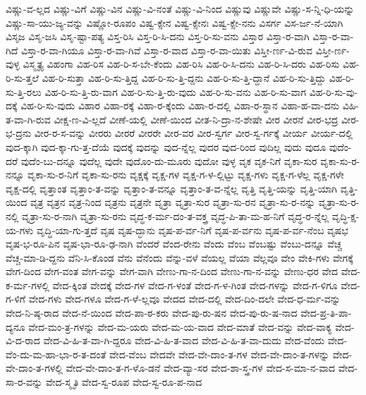 {ವಿಷ್ಣು-ವ-ಲ್ಲದ
ವಿಷ್ಣು-ವಿಗೆ
ವಿಷ್ಣು-ವಿನ
ವಿಷ್ಣು-ವಿ-ನಂತೆ
ವಿಷ್ಣು-ವಿ-ನಿಂದ
ವಿಷ್ಣುವು
ವಿಷ್ಣುವೇ
ವಿಷ್ಣು-ಸ-ನ್ನಿ-ಧಿ-ಯನ್ನು
ವಿಷ್ಣು-ಸಾ-ಯು-ಜ್ಯ-ವನ್ನು
ವಿಷ್ಣೋ-ರೂಪಂ
ವಿಷ್ವ-ಕ್ಸೇನ
ವಿಷ್ವ-ಕ್ಸೇನಃ
ವಿಷ್ವ-ಕ್ಸೇ-ನನು
ವಿಸರ್ಗ
ವಿಸ-ರ್ಜ-ನೆ-ಯಾಗಿ
ವಿಸೃಜ
ವಿಸೃ-ಜಸಿ
ವಿಸೃ-ಷ್ಟಾ-ಪತ್ಯ
ವಿಸ್ತ-ರಿಸಿ
ವಿಸ್ತ-ರಿ-ಸಿ-ದನು
ವಿಸ್ತ-ರಿ-ಸು-ವನು
ವಿಸ್ತಾರ
ವಿಸ್ತಾ-ರ-ವಾಗಿ
ವಿಸ್ತಾ-ರ-ವಾ-ಗಿದೆ
ವಿಸ್ತಾ-ರ-ವಾ-ಗಿಯೂ
ವಿಸ್ತಾ-ರ-ವಾ-ಗಿವೆ
ವಿಸ್ತಾ-ರ-ವಾದ
ವಿಸ್ತಾ-ರ-ವಾ-ಯಿತು
ವಿಸ್ತೀ-ರ್ಣ-ವಿ-ರುವ
ವಿಸ್ತೀ-ರ್ಣ-ವುಳ್ಳ
ವಿಸ್ಮೃತ್ಯ
ವಿಹಂಗಾ
ವಿಹ-ರಿಸ
ವಿಹ-ರಿ-ಸ-ಬೇ-ಕೆಂದು
ವಿಹ-ರಿಸಿ
ವಿಹ-ರಿ-ಸಿ-ದನು
ವಿಹ-ರಿ-ಸಿ-ದರು
ವಿಹ-ರಿಸು
ವಿಹ-ರಿ-ಸು-ತ್ತಲೆ
ವಿಹ-ರಿ-ಸುತ್ತಾ
ವಿಹ-ರಿ-ಸು-ತ್ತಿದ್ದ
ವಿಹ-ರಿ-ಸು-ತ್ತಿ-ದ್ದನು
ವಿಹ-ರಿ-ಸು-ತ್ತಿ-ದ್ದಾನೆ
ವಿಹ-ರಿ-ಸು-ತ್ತಿದ್ದು
ವಿಹ-ರಿ-ಸು-ತ್ತಿ-ರಲು
ವಿಹ-ರಿ-ಸು-ತ್ತಿ-ರು-ವಾಗ
ವಿಹ-ರಿ-ಸು-ತ್ತಿ-ರು-ವುದು
ವಿಹ-ರಿ-ಸು-ವನು
ವಿಹ-ರಿ-ಸು-ವಾಗ
ವಿಹ-ರಿ-ಸು-ವು-ದಕ್ಕೆ
ವಿಹ-ರಿ-ಸು-ವುದು
ವಿಹಾರ
ವಿಹಾ-ರಕ್ಕೆ
ವಿಹಾ-ರ-ಕ್ಕೆಂದು
ವಿಹಾ-ರ-ದಲ್ಲಿ
ವಿಹಾ-ರ-ಸ್ಥಾನ
ವಿಹಾ-ಹ-ವಾ-ದನು
ವಿಹಿ-ತ-ವಾ-ಗಿ-ರುವ
ವೀಕ್ಷ-ಣ-ವಿ-ಲ್ಲದೆ
ವೀಣೆ-ಯಲ್ಲಿ
ವೀಣೆ-ಯಿಂದ
ವೀತ-ನಿ-ದ್ರಾ-ನ-ಶೇಷೇ
ವೀರ
ವೀರನೆ
ವೀರ-ಭದ್ರ
ವೀರ-ಭ-ದ್ರನು
ವೀರ-ರ-ಸ-ವನ್ನು
ವೀರರು
ವೀರರೆ
ವೀರರೇ
ವೀರ-ವರ
ವೀರ-ಸ್ವರ್ಗ
ವೀರ-ಸ್ವ-ರ್ಗಕ್ಕೆ
ವೀರ್ಯ
ವೀರ್ಯ-ದಲ್ಲಿ
ವುದ-ಕ್ಕಾಗಿ
ವುದ-ಕ್ಕಾ-ಗು-ತ್ತ-ದೆಯೆ
ವುದಕ್ಕೆ
ವುದನ್ನು
ವುದ-ನ್ನೆಲ್ಲ
ವುದರ
ವುದ-ರಿಂದ
ವುದಿಲ್ಲ
ವುದು
ವುದೂ
ವುದೆಂ-ದರೆ
ವುದೆಂ-ಬು-ದನ್ನೂ
ವುದೆಲ್ಲ
ವುದೇ
ವುದೊಂ-ದು-ಮೂರು
ವುದೋ
ವುಳ್ಳ
ವೃಕ
ವೃಕ-ನಿಗೆ
ವೃಕಾ-ಸುರ
ವೃಕಾ-ಸು-ರ-ನನ್ನೂ
ವೃಕಾ-ಸು-ರ-ನಿಗೆ
ವೃಕಾ-ಸು-ರನು
ವೃಕ್ಷಕ್ಕೆ
ವೃಕ್ಷ-ಗಳ
ವೃಕ್ಷ-ಗ-ಳ-ಲ್ಲಿಟ್ಟು
ವೃಕ್ಷ-ಗಳು
ವೃಕ್ಷ-ಗ-ಳೆಲ್ಲ
ವೃಕ್ಷ-ಗಳೇ
ವೃಕ್ಷ-ದಲ್ಲಿ
ವೃತ್ತಾಂತ
ವೃತ್ತಾಂ-ತ-ವನ್ನು
ವೃತ್ತಾಂ-ತ-ವನ್ನೂ
ವೃತ್ತಾಂ-ತ-ವ-ನ್ನೆಲ್ಲ
ವೃತ್ತಿ
ವೃತ್ತಿ-ಯನ್ನು
ವೃತ್ತಿ-ಯಾಗಿ
ವೃತ್ತಿ-ಯಿಂದ
ವೃತ್ರ
ವೃತ್ರನ
ವೃತ್ರ-ನಿಂದ
ವೃತ್ರನು
ವೃತ್ರನೇ
ವೃತ್ರಾ
ವೃತ್ರಾ-ಸುರ
ವೃತ್ರಾ-ಸು-ರನ
ವೃತ್ರಾ-ಸು-ರ-ನನ್ನು
ವೃತ್ರಾ-ಸು-ರ-ನಲ್ಲಿ
ವೃತ್ರಾ-ಸು-ರ-ನಾಗಿ
ವೃತ್ರಾ-ಸು-ರನು
ವೃದ್ಧ-ಕ-ರ್ಮ-ದಂ-ತ-ವಕ್ತ್ರ
ವೃದ್ಧ-ಪಿ-ತಾ-ಮ-ಹ-ನಿಗೆ
ವೃದ್ಧ-ರ-ನ್ನೆಲ್ಲ
ವೃದ್ಧಿ-ಕ್ಷ-ಯ-ಗಳು
ವೃದ್ಧಿ-ಯಾ-ಗು-ತ್ತದೆ
ವೃಷ
ವೃಷ-ದ್ಭಾನು
ವೃಷ-ಪ-ರ್ವ-ನಿಗೆ
ವೃಷ-ಪ-ರ್ವನು
ವೃಷ-ಪ-ರ್ವ-ನೆಂಬ
ವೃಷಭ
ವೃಷ-ಭ-ರೂ-ಪಿನ
ವೃಷ-ಭಾ-ರೂ-ಢ-ನಾಗಿ
ವೆಂದರೆ
ವೆಂದ-ರೇನು
ವೆಂದು
ವೆಂಬ
ವೆಂಬಷ್ಟು
ವೆಂಬು-ದನ್ನೂ
ವೆಚ್ಚ
ವೆಚ್ಚ-ಮಾ-ಡಿ-ದ್ದನು
ವೆನಿ-ಸಿ-ಕೊಂಡ
ವೆನು
ವೆನೆಂದು
ವೆನ್ನು-ವಳೆ
ವೆಯಲ್ಲ
ವೆಯಾ
ವೆಲ್ಲವೂ
ವೇಂ
ವೇಕಿ-ಗಳು
ವೇಗಕ್ಕೆ
ವೇಗ-ದಿಂದ
ವೇಗ-ವಂತ
ವೇಗ-ವನ್ನು
ವೇಗ-ವಾಗಿ
ವೇಣು-ಗಾ-ನ-ದಿಂದ
ವೇಣು-ಗಾ-ನ-ವನ್ನು
ವೇಣು-ಧರ
ವೇದ
ವೇದ-ಕ-ರ್ಮ-ಗಳಲ್ಲಿ
ವೇದ-ಕ್ಕಿಂತ
ವೇದಕ್ಕೆ
ವೇದ-ಗಳ
ವೇದ-ಗ-ಳಂತೆ
ವೇದ-ಗ-ಳ-ಗಿಂತ
ವೇದ-ಗಳನ್ನು
ವೇದ-ಗ-ಳಿಗೂ
ವೇದ-ಗ-ಳಿಗೆ
ವೇದ-ಗಳು
ವೇದ-ಗಳೂ
ವೇದ-ಗ-ಳೆ-ಲ್ಲವೂ
ವೇದದ
ವೇದ-ದಲ್ಲಿ
ವೇದ-ದಿಂ-ದಲೇ
ವೇದ-ಧ-ರ್ಮ-ವನ್ನು
ವೇದ-ನಿ-ಷ್ಠ-ರಾದ
ವೇದ-ನೆ-ಯಿಂದ
ವೇದ-ಪಾ-ಠ-ಕರು
ವೇದ-ಪು-ರು-ಷನ
ವೇದ-ಪು-ರು-ಷ-ನಾದ
ವೇದ-ಪ್ರ-ತಿ-ಪಾ-ದ್ಯನೂ
ವೇದ-ಮಂ-ತ್ರ-ಗಳನ್ನು
ವೇದ-ಮ-ಯರು
ವೇದ-ಮ-ಯ-ವಾದ
ವೇದ-ಮಾತೆ
ವೇದ-ವನ್ನು
ವೇದ-ವಾಕ್ಯ
ವೇದ-ವಿ-ದ-ರಾದ
ವೇದ-ವಿ-ಹಿ-ತ-ವಾ-ಗಿ-ದ್ದರೂ
ವೇದ-ವಿ-ಹಿ-ತ-ವಾದ
ವೇದ-ವಿ-ಹಿ-ತ-ವಾ-ದುದು
ವೇದ-ವೆಂದು
ವೇದ-ವೆಂ-ದು-ಮ-ಹಾ-ಭಾ-ರ-ತ-ದಂತೆ
ವೇದ-ವೆಂಬ
ವೇದವೇ
ವೇದ-ವೇ-ದಾಂ-ತ-ಗಳ
ವೇದ-ವೇ-ದಾಂ-ತ-ಗಳನ್ನು
ವೇದ-ವೇ-ದಾಂ-ತ-ಗಳಲ್ಲಿ
ವೇದ-ವೇ-ದಾಂ-ತ-ಗ-ಳೊ-ಡನೆ
ವೇದ-ವ್ಯಾ-ಸರ
ವೇದ-ಶಾ-ಸ್ತ್ರ-ಗಳ
ವೇದ-ಸ-ಮಾ-ನ-ವಾದ
ವೇದ-ಸಾ-ರ-ವನ್ನು
ವೇದ-ಸ್ಮೃತಿ
ವೇದ-ಸ್ವ-ರೂಪ
ವೇದ-ಸ್ವ-ರೂ-ಪ-ನಾದ
}
